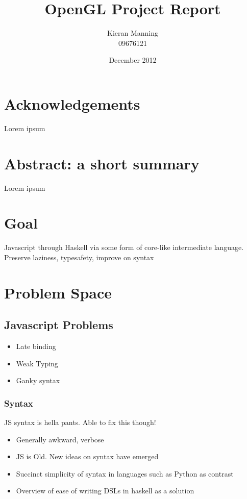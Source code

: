 \documentclass[11pt]{article}
\title{\textbf{OpenGL Project Report}}
\author{Kieran Manning \\ 09676121}
\date{December 2012}
\begin{document}
\maketitle





\tableofcontents

\setcounter{page}{1}

\section{Acknowledgements}
Lorem ipsum

\section{Abstract: a short summary} 
Lorem ipsum

\section{Goal}
Javascript through Haskell via some form of core-like intermediate language.
Preserve laziness, typesafety, improve on syntax

\newpage


\pagebreak

\section{Problem Space}
\subsection{Javascript Problems}
\begin{itemize}
\item Late binding
\item Weak Typing
\item Ganky syntax
\end{itemize}

\subsubsection{Syntax}
JS syntax is hella pants. Able to fix this though!
\begin{itemize}
\item Generally awkward, verbose
\item JS is Old. New ideas on syntax have emerged
\item Succinct simplicity of syntax in languages such as Python as contrast
\item Overview of ease of writing DSLs in haskell as a solution
\end{itemize}
\end{document}
